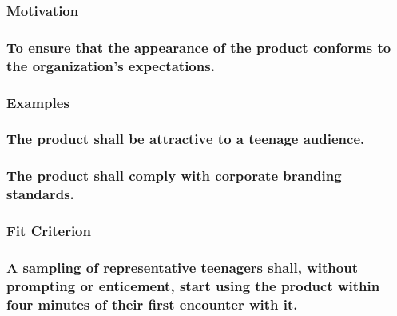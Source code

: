 \documentclass[
]{article}
\begin{document}
\hypertarget{motivation-29}{%
\subsubsection{Motivation}\label{motivation-29}}

\hypertarget{to-ensure-that-the-appearance-of-the-product-conforms-to-the-organizations-expectations.}{%
\subsubsection{\texorpdfstring{To ensure that the appearance of the
product conforms to the organization's expectations.
}{To ensure that the appearance of the product conforms to the organization's expectations. }}\label{to-ensure-that-the-appearance-of-the-product-conforms-to-the-organizations-expectations.}}

\hypertarget{examples-15}{%
\subsubsection{Examples}\label{examples-15}}

\hypertarget{the-product-shall-be-attractive-to-a-teenage-audience.}{%
\subsubsection{The product shall be attractive to a teenage
audience.}\label{the-product-shall-be-attractive-to-a-teenage-audience.}}

\hypertarget{the-product-shall-comply-with-corporate-branding-standards.}{%
\subsubsection{The product shall comply with corporate branding
standards.}\label{the-product-shall-comply-with-corporate-branding-standards.}}

\hypertarget{fit-criterion-1}{%
\subsubsection{\texorpdfstring{ Fit
Criterion}{ Fit Criterion}}\label{fit-criterion-1}}

\hypertarget{a-sampling-of-representative-teenagers-shall-without-prompting-or-enticement-start-using-the-product-within-four-minutes-of-their-first-encounter-with-it.}{%
\subsubsection{\texorpdfstring{A sampling of representative teenagers
shall, without prompting or enticement, start using the product within
four minutes of their first encounter with it.
}{A sampling of representative teenagers shall, without prompting or enticement, start using the product within four minutes of their first encounter with it. }}\label{a-sampling-of-representative-teenagers-shall-without-prompting-or-enticement-start-using-the-product-within-four-minutes-of-their-first-encounter-with-it.}}
\end{document}

